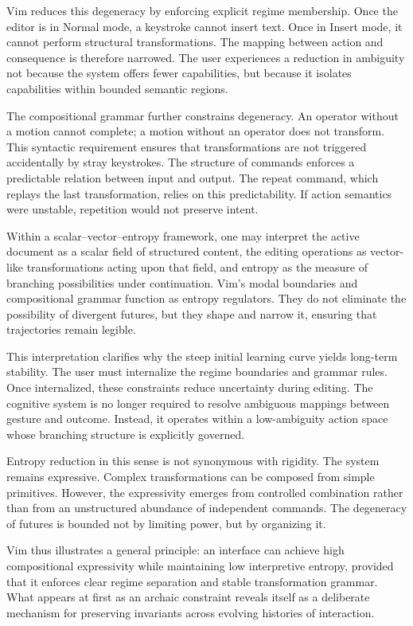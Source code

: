 \documentclass[12pt]{article}
\begin{document}
Vim reduces this degeneracy by enforcing explicit regime membership. Once the editor is in Normal mode, a keystroke cannot insert text. Once in Insert mode, it cannot perform structural transformations. The mapping between action and consequence is therefore narrowed. The user experiences a reduction in ambiguity not because the system offers fewer capabilities, but because it isolates capabilities within bounded semantic regions.

The compositional grammar further constrains degeneracy. An operator without a motion cannot complete; a motion without an operator does not transform. This syntactic requirement ensures that transformations are not triggered accidentally by stray keystrokes. The structure of commands enforces a predictable relation between input and output. The repeat command, which replays the last transformation, relies on this predictability. If action semantics were unstable, repetition would not preserve intent.

Within a scalar–vector–entropy framework, one may interpret the active document as a scalar field of structured content, the editing operations as vector-like transformations acting upon that field, and entropy as the measure of branching possibilities under continuation. Vim’s modal boundaries and compositional grammar function as entropy regulators. They do not eliminate the possibility of divergent futures, but they shape and narrow it, ensuring that trajectories remain legible.

This interpretation clarifies why the steep initial learning curve yields long-term stability. The user must internalize the regime boundaries and grammar rules. Once internalized, these constraints reduce uncertainty during editing. The cognitive system is no longer required to resolve ambiguous mappings between gesture and outcome. Instead, it operates within a low-ambiguity action space whose branching structure is explicitly governed.

Entropy reduction in this sense is not synonymous with rigidity. The system remains expressive. Complex transformations can be composed from simple primitives. However, the expressivity emerges from controlled combination rather than from an unstructured abundance of independent commands. The degeneracy of futures is bounded not by limiting power, but by organizing it.

Vim thus illustrates a general principle: an interface can achieve high compositional expressivity while maintaining low interpretive entropy, provided that it enforces clear regime separation and stable transformation grammar. What appears at first as an archaic constraint reveals itself as a deliberate mechanism for preserving invariants across evolving histories of interaction.
\end{document}
